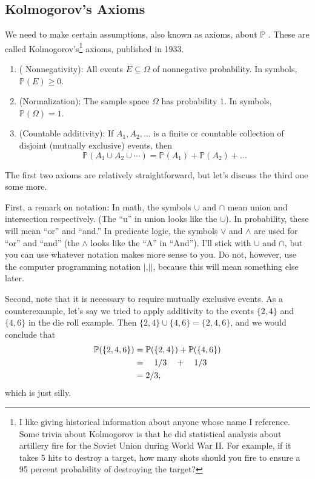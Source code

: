\documentclass{ximera}
\begin{document}
\subsection{Kolmogorov's Axioms}
We need to make certain assumptions, also known as axioms, about $\mathbb{P}$ . These are called Kolmogorov's\footnote{I like giving historical information about anyone whose name I reference. Some trivia about Kolmogorov is that he did statistical analysis about artillery fire for the Soviet Union during World War II. For example, if it takes 5 hits to destroy a target, how many shots should you fire to ensure a 95 percent probability of destroying the target?} axioms, published in 1933.

\begin{enumerate}
\item ({\color{red} Nonnegativity)}: All events $E\subseteq \Omega$ of nonnegative probability. In symbols, $\mathbb{P}(E) \geq 0$.

\item {\color{red} (Normalization)}: The sample space $\Omega$ has probability $1$. In symbols, $\mathbb{P}(\Omega)=1$.

\item {\color{red} (Countable additivity)}: If $A_1,A_2,\ldots$ is a finite or countable collection of disjoint (mutually exclusive) events, then
$$
\mathbb{P}(A_1 \cup A_2 \cup \cdots ) = \mathbb{P}(A_1) + \mathbb{P}(A_2) + \ldots
$$
\end{enumerate}

The first two axioms are relatively straightforward, but let's discuss the third one some more. 

{\color{lime} First, a remark on notation}: In math, the symbols $\cup$ and $\cap$ mean union and intersection respectively. (The ``u'' in union looks like the $\cup$). In probability, these will mean ``or'' and ``and.'' In predicate logic, the symbols $\vee$ and $\wedge$ are used for ``or'' and ``and'' (the $\wedge$ looks like the ``A'' in ``And''). I'll stick with $\cup$ and $\cap$, but you can use whatever notation makes more sense to you. Do not, however, use the computer programming notation $|$,$||$, because this will mean something else later.

Second, note that it is necessary to require mutually exclusive events. As a counterexample, let's say we tried to apply additivity to the events $\{2,4\}$ and $\{4,6\}$ in the die roll example. Then $\{2,4\} \cup \{4,6\} = \{2,4,6\}$, and we would conclude that
\begin{align*}
\mathbb{P}(\{2,4,6\}) &= \mathbb{P}(\{2,4\}) + \mathbb{P}(\{4,6\}) \\
&= \quad 1/3 \quad + \quad  1/3\\
&=2/3,
\end{align*}
which is just silly.
\end{document}
